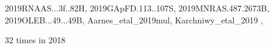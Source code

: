 \documentclass[12pt]{article}
\begin{document}
\begin{description}
{2019RNAAS...3f..82H,%
2019GApFD.113..107S,%
2019MNRAS.487.2673B,%
2019OLEB...49...49B,%
Aarnes_etal_2019mul,%
Karchniwy_etal_2019%
},\item
\item %
32 times in 2018 \citep{
2018AN....339..127K,%
2018A&A...614A.101V,%
2018A&A...616A..72W,%
2018A&A...609A..51W,%
2018JAtS...75.3469L,%
2018ApJ...858..124S,%
2018arXiv181207916K,%
2018JPhCS1031a2007M,%
2018MNRAS.479.3923Z,%
2018A&A...618A..75S,%
2018RNAAS...2d.195L,%
2018AN....339..641B,%
2018ApJ...868...27Y,%
2018MNRAS.481.3401T,%
2018A&A...616A.160V,%
2018PhRvE..97b3105B,%
2018PhRvE..98f3107B,%
}
\end{description}
\end{document}
